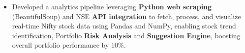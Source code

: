 \documentclass[10pt]{extarticle}
\begin{document}
\begin{itemize}
\begin{itemize}
        \item Developed a analytics pipeline leveraging \textbf{Python web scraping} (BeautifulSoup) and NSE \textbf{API integration} to fetch, process, and visualize real-time Nifty stock data using Pandas and NumPy, enabling stock trend identification, Portfolio \textbf{Risk Analysis} and \textbf{Suggestion Engine}, boosting overall portfolio performance by 10\%.
    \end{itemize}
\end{itemize}
\end{document}
